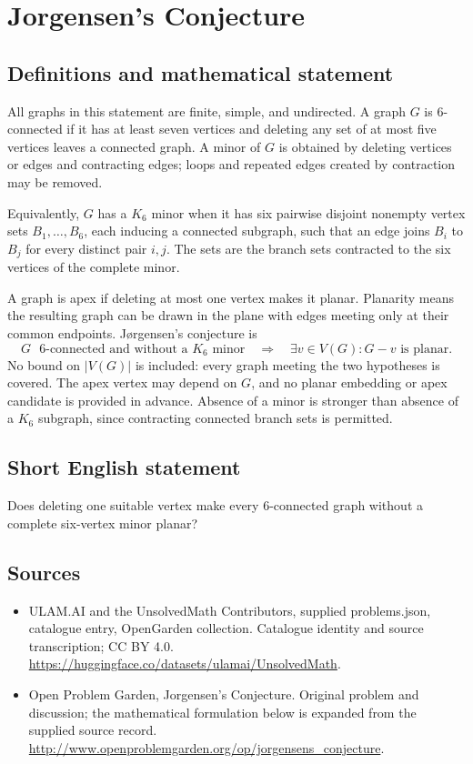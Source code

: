 \documentclass[11pt,a4paper]{article}
\begin{document}
\section*{Jorgensen's Conjecture}\label{statement}

\subsection{Definitions and mathematical statement}
All graphs in this statement are finite, simple, and
undirected. A graph $G$ is $6$-connected if it has at
least seven vertices and deleting any set of at most
five vertices leaves a connected graph. A minor of
$G$ is obtained by deleting vertices or edges and
contracting edges; loops and repeated edges created
by contraction may be removed.

Equivalently, $G$ has a $K_6$ minor when it has six
pairwise disjoint nonempty vertex sets
$B_1,\ldots,B_6$, each inducing a connected subgraph,
such that an edge joins $B_i$ to $B_j$ for every
distinct pair $i,j$. The sets are the branch sets
contracted to the six vertices of the complete minor.

A graph is apex if deleting at most one vertex makes
it planar. Planarity means the resulting graph can
be drawn in the plane with edges meeting only at
their common endpoints. Jørgensen's conjecture is
\[
 G\text{ $6$-connected and without a $K_6$ minor}
 \quad\Longrightarrow\quad
 \exists v\in V(G):G-v\text{ is planar}.
\]
No bound on $|V(G)|$ is included: every graph meeting
the two hypotheses is covered. The apex vertex may
depend on $G$, and no planar embedding or apex
candidate is provided in advance. Absence of a minor
is stronger than absence of a $K_6$ subgraph, since
contracting connected branch sets is permitted.
\subsection{Short English statement}
Does deleting one suitable vertex make every 6-connected graph without a complete six-vertex minor planar?
\subsection{Sources}
\begin{itemize}
\item[S1] ULAM.AI and the UnsolvedMath Contributors, supplied problems.json, catalogue entry, OpenGarden collection. Catalogue identity and source transcription; CC BY 4.0.
\url{https://huggingface.co/datasets/ulamai/UnsolvedMath}.
\item[S2] Open Problem Garden, Jorgensen's Conjecture. Original problem and discussion; the mathematical formulation below is expanded from the supplied source record.
\url{http://www.openproblemgarden.org/op/jorgensens_conjecture}.
\end{itemize}
\end{document}
